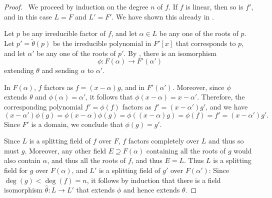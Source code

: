 \documentclass[12pt]{report}
\numberwithin{equation}{section}
\numberwithin{theorem}{chapter}
\theoremstyle{definition}
\newtheorem*{basic properties}{Basic Properties}
\newtheorem*{Important Remark}{Important Remark}
\begin{document}
\begin{proof}$\,$
 We proceed by induction on the degree $n$ of $f$.
If $f$ is linear, then so is $f'$, and in this case $L = F$ and $L' = F'$. We have shown this already in .


Let $p$ be any irreducible factor of $f$, and let $\alpha \in L$ be any one
of the roots of $p$.
Let $p'=\tilde\theta(p)$ be the irreducible polynomial in $F'[x]$ that
corresponds to $p$, and let $\alpha'$ be any one
of the roots of $p'$. By , there is an isomorphism 
$$\phi\!: F(\alpha) \to F'(\alpha')$$ 
extending $\theta$ and sending $\alpha$ to $\alpha'$.

%
%
%
%
%
In $F(\alpha)$, $f$ factors as $f = (x-\alpha) g$, and in $F'(\alpha')$. Moreover, since $\phi$ extends $\theta$ and $\phi(\alpha) = \alpha'$, it follows that $\phi(x-\alpha)= x- \alpha'$. Therefore, the corresponding polynomial $f' = \phi(f)$ factors as $f' = (x- \alpha') g'$, and we have
$$(x-\alpha') \phi(g) = \phi(x-\alpha) \phi(g) = \phi((x-\alpha) g) = \phi(f) = f' = (x-\alpha') g'.$$
Since $F'$ is a domain, we conclude that $\phi(g) = g'$.



Since $L$ is a splitting field of $f$ over $F$, $f$ factors completely over $L$ and thus so must $g$. Moreover, any other field $E \supseteq F(\alpha)$ containing all the roots of $g$ would also contain $\alpha$, and thus all the roots of $f$, and thus $E = L$.
Thus $L$ is a splitting field for $g$ over $F(\alpha)$, and $L'$ is a splitting field of $g'$ over $F(\alpha')$:
Since $\deg(g) < \deg(f) = n$, it follows by induction that there is a field isomorphism $\widehat{\theta}: L \to L'$ that extends $\phi$ and hence extends $\theta$.
\end{proof}
\end{document}
